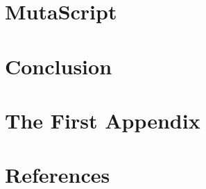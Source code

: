 \documentclass[12pt,twoside]{reedthesis}
\theoremstyle{definition}
\theoremstyle{definition}
\theoremstyle{remark}
\begin{document}
  \chapter{MutaScript}\label{mutascript}
  
  \chapter*{Conclusion}\label{conclusion}
  
  \chapter{The First Appendix}\label{the-first-appendix}
  
  \chapter*{References}\label{references}


\end{document}
